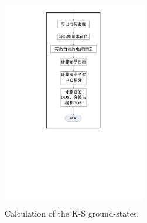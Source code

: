 \documentclass[cjk,slidestop,compress,mathserif,blue]{beamer}
\begin{document}
\frame
{
\frametitle{}
\begin{figure}[h!]
\centering
\vspace*{-0.65in}
\includegraphics[height=3.62in,width=2.45in,viewport=177 305 417 813,clip]{Figures/VASP_main_Flow-4.pdf}
\caption{\tiny \textrm{Calculation of the K-S ground-states.}}%
\label{VASP_Follow-4}
\end{figure}
}
\end{document}
